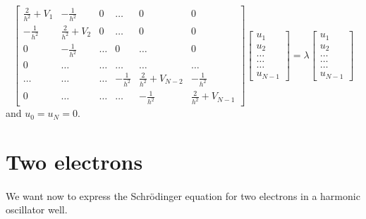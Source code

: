 \documentclass[a4paper, twoside, 11pt]{report}
\theoremstyle{theorem}
\theoremstyle{remark}
\theoremstyle{exemple}
\begin{document}
        \begin{equation}
              \begin{bmatrix} \frac{2}{h^2}+V_1 & -\frac{1}{h^2} & 0    & \dots  &0     & 0 \\
                                -\frac{1}{h^2} & \frac{2}{h^2}+V_2 & 0    & \dots  &0     &0 \\
                                0   & -\frac{1}{h^2} & \dots  &0       &\dots & 0\\
                                0	& \dots & \dots &\dots      &\dots & \dots\\
                                \dots   & \dots & \dots  &-\frac{1}{h^2}  &\frac{2}{h^2}+V_{N-2} & -\frac{1}{h^2}\\
                                0   & \dots & \dots  &\dots       &-\frac{1}{h^2} & \frac{2}{h^2}+V_{N-1}
             \end{bmatrix} \begin{bmatrix} u_{1} \\
                                                              u_{2} \\
                                                              \dots\\ \dots\\ \dots\\
                                                              u_{N-1}
             \end{bmatrix}=\lambda \begin{bmatrix} u_{1} \\
                                                              u_{2} \\
                                                              \dots\\ \dots\\ \dots\\
                                                              u_{N-1}
             \end{bmatrix}
             \tag{4}
        \end{equation}
    and $u_0 = u_N = 0$. 


    \section{Two electrons}
    
            \paragraph{}We want now to express the Schrödinger equation for two electrons in a harmonic oscillator well. 
\end{document}
